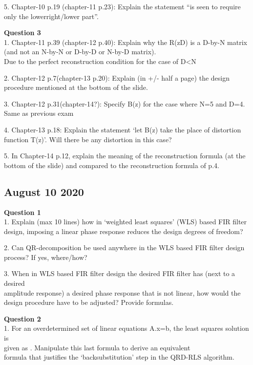 \documentclass[
  a4paper,
  ,captions=tableheading
]{scrartcl}
\begin{document}
5. Chapter-10 p.19 (chapter-11 p.23): Explain the statement ``is seen to
require only the lowerright/lower part''.

\textbf{Question 3}\\
1. Chapter-11 p.39 (chapter-12 p.40): Explain why the R(zD) is a D-by-N
matrix (and not an N-by-N or D-by-D or N-by-D matrix).\\
Due to the perfect reconstruction condition for the case of D\textless N

2. Chapter-12 p.7(chapter-13 p.20): Explain (in +/- half a page) the
design procedure mentioned at the bottom of the slide.

3. Chapter-12 p.31(chapter-14?): Specify B(z) for the case where N=5 and
D=4.\\
Same as previous exam

4. Chapter-13 p.18: Explain the statement `let B(z) take the place of
distortion function T(z)'. Will there be any distortion in this case?

5. In Chapter-14 p.12, explain the meaning of the reconstruction formula
(at the bottom of the slide) and compared to the reconstruction formula
of p.4.

\subsection{August 10 2020}\label{august-10-2020}

\textbf{Question 1}\\
1. Explain (max 10 lines) how in `weighted least squares' (WLS) based
FIR filter\\
design, imposing a linear phase response reduces the design degrees of
freedom?

2. Can QR-decomposition be used anywhere in the WLS based FIR filter
design\\
process? If yes, where/how?

3. When in WLS based FIR filter design the desired FIR filter has (next
to a desired\\
amplitude response) a desired phase response that is not linear, how
would the\\
design procedure have to be adjusted? Provide formulas.

\textbf{Question 2}\\
1. For an overdetermined set of linear equations A.x=b, the least
squares solution is\\
given as . Manipulate this last formula to derive an equivalent\\
formula that justifies the `backsubstitution' step in the QRD-RLS
algorithm.
\end{document}

